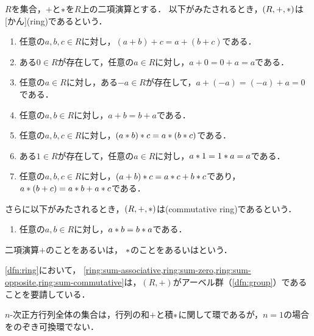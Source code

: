 \documentclass[../sotsu.tex]{subfiles}
\begin{document}
\begin{definition}[環]
    \label{dfn:ring}
    $R$を集合，$+$と$\mathbin{\ast}$を$R$上の二項演算とする．
    以下がみたされるとき，$(R, +, \mathbin{\ast})$は[かん](ring)であるという．
    \begin{enumerate}[ref={条件-\arabic*}]
        \item \label{ring:sum-associative} 任意の$a, b, c \in R$に対し，$(a + b) + c = a + (b + c)$である．
        \item \label{ring:sum-zero} ある$0 \in R$が存在して，任意の$a \in R$に対し，$a + 0 = 0 + a = a$である．
        \item \label{ring:sum-opposite} 任意の$a \in R$に対し，ある$-a \in R$が存在して，$a + (-a) = (-a) + a = 0$である．
        \item \label{ring:sum-commutative} 任意の$a, b \in R$に対し，$a + b = b + a$である．
        \item \label{ring:prod-associative} 任意の$a, b, c \in R$に対し，$(a \mathbin{\ast} b) \mathbin{\ast} c = a \mathbin{\ast} (b \mathbin{\ast} c)$である．
        \item \label{ring:prod-one} ある$1 \in R$が存在して，任意の$a \in R$に対し，$a \mathbin{\ast} 1 = 1 \mathbin{\ast} a = a$である．
        \item \label{ring:distributive} 任意の$a, b, c \in R$に対し，$(a + b) \mathbin{\ast} c = a \mathbin{\ast} c + b \mathbin{\ast} c$であり，$a \mathbin{\ast} (b + c) = a \mathbin{\ast} b + a \mathbin{\ast} c$である．
    \end{enumerate}
    さらに以下がみたされるとき，$(R, +, \mathbin{\ast})$は(commutative ring)であるという．
    \begin{enumerate}[resume]
        \item 任意の$a, b \in R$に対し，$a \mathbin{\ast} b = b \mathbin{\ast} a$である．
    \end{enumerate}
    二項演算$+$のことをあるいは，
    $\mathbin{\ast}$のことをあるいはという．

\end{definition}

\cref{dfn:ring}において，
\cref{ring:sum-associative,ring:sum-zero,ring:sum-opposite,ring:sum-commutative}は，$(R, +)$がアーベル群（\cref{dfn:group}）であることを要請している．


\begin{example}
    $n$-次正方行列全体の集合は，行列の和$+$と積$\mathbin{\ast}$に関して環であるが，$n = 1$の場合をのぞき可換環でない．
\end{example}
\end{document}
